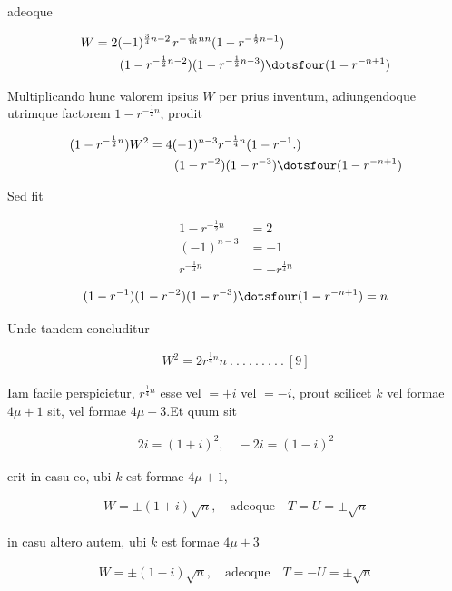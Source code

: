 adeoque

\[
\begin{aligned}
W&=2(-1)^{\frac34n-2}\,r^{-\frac1{16}nn}(1-r^{-\frac12n-1})\\&\qquad(1-r^{-\frac12n-2})(1-r^{-\frac12n-3})\dotsfour(1-r^{-n+1})
\end{aligned}
\]

Multiplicando hunc valorem ipsius $W$ per prius inventum, adiungendoque utrimque factorem $1-r^{-\frac12n}$, prodit

\[
\begin{aligned}
(1-r^{-\frac12n})W^2&=4(-1)^{n-3}r^{-\frac14n}(1-r^{-1}\mathord{.})\\&\qquad(1-r^{-2})(1-r^{-3})\dotsfour(1-r^{-n+1})
\end{aligned}
\]

Sed fit

\[
\begin{aligned}
1-r^{-\frac12n}&=2\\
(-1)^{n-3}&=-1\\
r^{-\frac14n}&=-r^{\frac14n}
\end{aligned}
\]

\[
\begin{aligned}
(1-r^{-1})(1-r^{-2})(1-r^{-3})\dotsfour(1-r^{-n+1})=n
\end{aligned}
\]

Unde tandem concluditur


\[
\begin{aligned}
W^2=2r^{\frac14n}n\  .\  .\  .\  .\  .\  .\  .\  .\  .\ [9]
\end{aligned}
\]

Iam facile perspicietur, $r^{\frac14n}$ esse vel $=+i$ vel $=-i$, prout scilicet $k$ vel formae $4\mu+1$ sit, vel formae $4\mu+3$.\quad Et quum sit

\[
\begin{aligned}
2i=(1+i)^2,\quad -2i=(1-i)^2
\end{aligned}
\]

erit in casu eo, ubi $k$ est formae $4\mu+1$,

\[
\begin{aligned}
W=\pm(1+i)\surd n,\quad\text{adeoque}\quad T=U=\pm\surd n
\end{aligned}
\]

in casu altero autem, ubi $k$ est formae $4\mu+3$

\[
\begin{aligned}
W=\pm(1-i)\surd n,\quad\text{adeoque}\quad T=-U=\pm\surd n
\end{aligned}
\]
